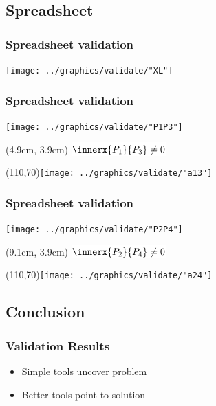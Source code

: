 \documentclass[handout]{beamer}
\begin{document}
\subsection{Spreadsheet}

\begin{frame}
  \frametitle{Spreadsheet validation}  %
  \centering
  \texttt{[image: ../graphics/validate/"XL"]}
\end{frame}

\begin{frame}
  \frametitle{Spreadsheet validation}  %
  \centering
  \texttt{[image: ../graphics/validate/"P1P3"]}
  \begin{textblock*}{5cm}(4.9cm, 3.9cm)%
     \colorbox{white}{ $\innerx{P_{1}}{P_{3}} \ne 0$ }
  \end{textblock*}
  \Put(110,70){\texttt{[image: ../graphics/validate/"a13"]}}
\end{frame}

\begin{frame}
  \frametitle{Spreadsheet validation}  %
  \centering
  \texttt{[image: ../graphics/validate/"P2P4"]}
  \begin{textblock*}{5cm}(9.1cm, 3.9cm)%
     \colorbox{white}{ $\innerx{P_{2}}{P_{4}} \ne 0$ }
  \end{textblock*}
  \Put(110,70){\texttt{[image: ../graphics/validate/"a24"]}}
  \onedot
\end{frame}

\subsection{Conclusion}

\begin{frame}
  \frametitle{Validation Results}  %
  \begin{itemize}
    \item Simple tools uncover problem
    \item Better tools point to solution
  \end{itemize}
  \twodots
\end{frame}

\begin{frame}
  \titlepage
\end{frame}
\end{document}
